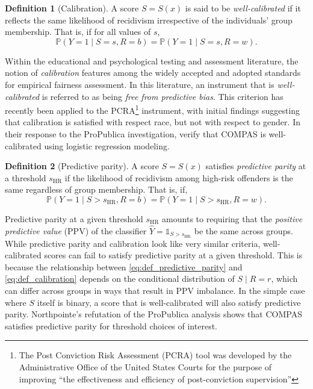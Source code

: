 \documentclass[11pt, svgnames]{article}
\renewcommand{\P}{\mathbb{P}}
\newcommand{\one}{\mathds{1}}
\numberwithin{equation}{section}
\theoremstyle{plain}
\theoremstyle{definition}
\newtheorem{definition}{Definition}
\numberwithin{prop}{section}
\numberwithin{corollary}{section}
\begin{document}
 \begin{definition}[Calibration]
   A score $S = S(x)$ is said to be \emph{well-calibrated} if it reflects the same likelihood of recidivism irrespective of the individuals' group membership. That is, if for all values of $s$,
   \begin{equation}
   \P(Y = 1 \mid S = s, R = b) = \P(Y = 1 \mid S = s, R = w).
   \label{eq:def_calibration}
   \end{equation}
 \end{definition}
 
 Within the educational and psychological testing and assessment literature, the notion of \emph{calibration} features among the widely accepted and adopted standards for empirical fairness assessment.  In this literature, an instrument that is \emph{well-calibrated} is referred to as being \emph{free from predictive bias}.  This criterion has recently been applied to the PCRA\footnote{The Post Conviction Risk Assessment (PCRA) tool was developed by the Administrative Office of the United States Courts for the purpose of improving ``the effectiveness and efficiency of post-conviction supervision''\citep{pcra}} instrument, with initial findings suggesting that calibration is satisfied with respect race\citep{singh2013predictive, skeem2015risk}, but not with respect to gender\citep{skeem2016gender}.   In their response to the ProPublica investigation, \citet{floresfalse} verify that COMPAS is well-calibrated using logistic regression modeling. 
  
 \begin{definition}[Predictive parity]
   A score $S = S(x)$ satisfies \emph{predictive parity} at a threshold $s_\mathrm{HR}$ if the likelihood of recidivism among high-risk offenders is the same regardless of group membership. That is, if,
   \begin{equation}
   \P(Y = 1 \mid S > s_\mathrm{HR} , R = b) = \P(Y = 1 \mid S > s_\mathrm{HR}, R = w).
   \label{eq:def_predictive_parity}
   \end{equation}
 \end{definition}
 
 Predictive parity at a given threshold $s_\mathrm{HR}$ amounts to requiring that the \emph{positive predictive value} (PPV) of the classifier $\hat Y = \one_{S > s_\mathrm{HR}}$ be the same across groups.  While predictive parity and calibration look like very similar criteria, well-calibrated scores can fail to satisfy predictive parity at a given threshold.  This is because the relationship between \eqref{eq:def_predictive_parity} and \eqref{eq:def_calibration} depends on the conditional distribution of $S \mid R = r$, which can differ across groups in ways that result in PPV imbalance.  In the simple case where $S$ itself is binary, a score that is well-calibrated will also satisfy predictive parity. Northpointe's refutation\cite{dieterich2016compas} of the ProPublica analysis shows that COMPAS satisfies predictive parity for threshold choices of interest. 
\end{document}
